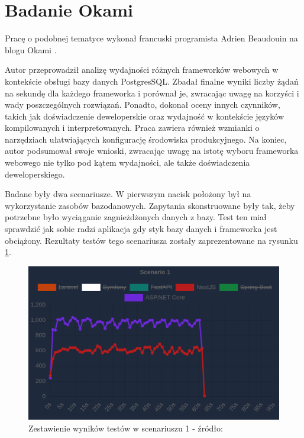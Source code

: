 \section{Badanie Okami}
Pracę o podobnej tematyce wykonał francuski programista Adrien Beaudouin na blogu Okami \cite{okami1012024Benchmark}.

Autor przeprowadził analizę wydajności różnych frameworków webowych w kontekście obsługi bazy danych PostgresSQL.
Zbadał finalne wyniki liczby żądań na sekundę dla każdego frameworka i porównał je, zwracając uwagę na korzyści i wady poszczególnych rozwiązań. 
Ponadto, dokonał oceny innych czynników, takich jak doświadczenie deweloperskie oraz wydajność w kontekście języków kompilowanych i interpretowanych.
Praca zawiera również wzmianki o narzędziach ułatwiających konfigurację środowiska produkcyjnego.
Na koniec, autor podsumował swoje wnioski, zwracając uwagę na istotę wyboru frameworka webowego nie tylko pod kątem wydajności, ale także doświadczenia deweloperskiego.

Badane były dwa scenariusze.
W pierwszym nacisk położony był na wykorzystanie zasobów bazodanowych. 
Zapytania skonstruowane były tak, żeby potrzebne było wyciąganie zagnieżdżonych danych z bazy.
Test ten miał sprawdzić jak sobie radzi aplikacja gdy styk bazy danych i frameworka jest obciążony.
Rezultaty testów tego scenariusza zostały zaprezentowane na rysunku \ref{rys:oklatest1}.
\begin{figure}[!hb]
	\centering \includegraphics[width=1\linewidth]{rysunki/okla_test_1.png}
	\caption{Zestawienie wyników testów w scenariuszu 1 - źródło: \cite{okami1012024Benchmark}}
	\label{rys:oklatest1}
\end{figure}

